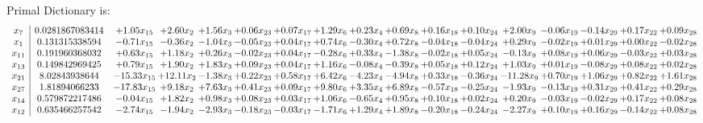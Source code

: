 \documentclass[9pt]{article}
\begin{document}
Primal Dictionary is:
\[\begin{array}{c| c c@{\hskip 2pt} c@{\hskip 2pt} c@{\hskip 2pt} c@{\hskip 2pt} c@{\hskip 2pt} c@{\hskip 2pt} c@{\hskip 2pt} c@{\hskip 2pt} c@{\hskip 2pt} c@{\hskip 2pt} c@{\hskip 2pt} c@{\hskip 2pt} c@{\hskip 2pt} c@{\hskip 2pt} c@{\hskip 2pt} }
 x_{7}   &  0.0281867083414 & +  1.05 x_{15} & +  2.60 x_{2} & +  1.56 x_{3} & +  0.06 x_{23} & +  0.07 x_{17} & +  1.29 x_{6} & +  0.23 x_{4} & +  0.69 x_{8} & +  0.16 x_{18} & +  0.10 x_{24} & +  2.00 x_{9} & -0.06 x_{19} & -0.14 x_{29} & +  0.17 x_{22} & +  0.09 x_{28}\\
 x_{1}   &  0.131315338594 & -0.71 x_{15} & -0.36 x_{2} & -1.04 x_{3} & -0.05 x_{23} & +  0.04 x_{17} & +  0.74 x_{6} & -0.30 x_{4} & +  0.72 x_{8} & -0.04 x_{18} & -0.04 x_{24} & +  0.29 x_{9} & -0.02 x_{19} & +  0.01 x_{29} & +  0.00 x_{22} & -0.02 x_{28}\\
 x_{11}   &  0.191960368032 & +  0.63 x_{15} & +  1.18 x_{2} & +  0.26 x_{3} & -0.02 x_{23} & +  0.04 x_{17} & -0.28 x_{6} & +  0.33 x_{4} & -1.38 x_{8} & -0.02 x_{18} & +  0.05 x_{24} & -0.13 x_{9} & +  0.08 x_{19} & +  0.06 x_{29} & -0.03 x_{22} & +  0.03 x_{28}\\
 x_{13}   &  0.149842969425 & +  0.79 x_{15} & +  1.90 x_{2} & +  1.83 x_{3} & +  0.09 x_{23} & +  0.04 x_{17} & +  1.16 x_{6} & -0.08 x_{4} & -0.39 x_{8} & +  0.05 x_{18} & +  0.12 x_{24} & +  1.03 x_{9} & +  0.01 x_{19} & -0.08 x_{29} & +  0.08 x_{22} & +  0.02 x_{28}\\
 x_{21}   &  8.02843938644 & -15.33 x_{15} & + 12.11 x_{2} & -1.38 x_{3} & +  0.22 x_{23} & +  0.58 x_{17} & +  6.42 x_{6} & -4.23 x_{4} & -4.94 x_{8} & +  0.33 x_{18} & -0.36 x_{24} & -11.28 x_{9} & +  0.70 x_{19} & +  1.06 x_{29} & +  0.82 x_{22} & +  1.61 x_{28}\\
 x_{27}   &  1.81894066233 & -17.83 x_{15} & +  9.18 x_{2} & +  7.63 x_{3} & +  0.41 x_{23} & +  0.09 x_{17} & +  9.80 x_{6} & +  3.35 x_{4} & +  6.89 x_{8} & -0.57 x_{18} & -0.25 x_{24} & -1.93 x_{9} & -0.13 x_{19} & +  0.31 x_{29} & +  0.41 x_{22} & +  0.29 x_{28}\\
 x_{14}   &  0.579872217486 & -0.04 x_{15} & +  1.82 x_{2} & +  0.98 x_{3} & +  0.08 x_{23} & +  0.03 x_{17} & +  1.06 x_{6} & -0.65 x_{4} & +  0.95 x_{8} & +  0.10 x_{18} & +  0.02 x_{24} & +  0.20 x_{9} & -0.03 x_{19} & -0.02 x_{29} & +  0.17 x_{22} & +  0.08 x_{28}\\
 x_{12}   &  0.635466257542 & -2.74 x_{15} & -1.94 x_{2} & -2.93 x_{3} & -0.18 x_{23} & -0.03 x_{17} & -1.71 x_{6} & +  1.29 x_{4} & +  1.89 x_{8} & -0.20 x_{18} & -0.24 x_{24} & -2.27 x_{9} & +  0.10 x_{19} & +  0.16 x_{29} & -0.14 x_{22} & +  0.08 x_{28}\\

\end{array}\]
\end{document}
